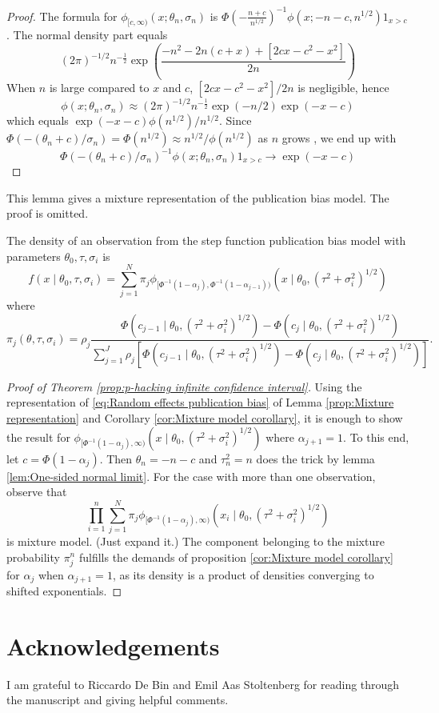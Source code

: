 \documentclass[twoside]{article}
\begin{document}
\begin{proof}
The formula for $\phi_{[c,\infty)}(x;\theta_{n},\sigma_{n})$
is $\Phi(-\frac{n+c}{n^{1/2}})^{-1}\phi(x;-n-c,n^{1/2})1_{x>c}$.
The normal density part equals 
\[
(2\pi)^{-1/2}n^{-\frac{1}{2}}\exp\left(\frac{-n^{2}-2n(c+x)+[2cx-c^{2}-x^{2}]}{2n}\right)
\]
When $n$ is large compared to $x$ and $c$, $[2cx-c^{2}-x^{2}]/2n$
is negligible, hence 
\[
\phi(x;\theta_{n},\sigma_{n})\approx(2\pi)^{-1/2}n^{-\frac{1}{2}}\exp(-n/2)\exp(-x-c)
\]
which equals $\exp(-x-c)\phi(n^{1/2})/n^{1/2}$.
Since $\Phi(-(\theta_{n}+c)/\sigma_{n})=\Phi(n^{1/2})\approx n^{1/2}/\phi(n^{1/2})$
as $n$ grows \citep[equation 5]{borjesson1979simple},
we end up with $$\Phi(-(\theta_{n}+c)/\sigma_{n})^{-1}\phi(x;\theta_{n},\sigma_{n})1_{x>c}\to\exp(-x-c)$$
\end{proof}
%
This lemma gives a mixture representation of the publication bias
model. The proof is omitted.
\begin{lem}
\label{prop:Mixture representation} The density of an observation
from the step function publication bias model with parameters $\theta_{0},\tau,\sigma_{i}$
is
\begin{equation}
f(x\mid\theta_{0},\tau,\sigma_{i})=\sum_{j=1}^{N}\pi_{j}\phi_{[\Phi^{-1}(1-\alpha_{j}),\Phi^{-1}(1-\alpha_{j-1}))}(x\mid\theta_{0},(\tau^{2}+\sigma_{i}^{2})^{1/2})\label{eq:Random effects publication bias}
\end{equation}
where 
\[
\pi_{j}(\theta,\tau,\sigma_{i})=\rho_{j}\frac{\Phi(c_{j-1}\mid\theta_{0},(\tau^{2}+\sigma_{i}^{2})^{1/2})-\Phi(c_{j}\mid\theta_{0},(\tau^{2}+\sigma_{i}^{2})^{1/2})}{\sum_{j=1}^{J}\rho_{j}[\Phi(c_{j-1}\mid\theta_{0},(\tau^{2}+\sigma_{i}^{2})^{1/2})-\Phi(c_{j}\mid\theta_{0},(\tau^{2}+\sigma_{i}^{2})^{1/2})]}.
\]
\end{lem}

\begin{proof}[Proof of Theorem \ref{prop:p-hacking infinite confidence interval}]
Using the representation of \cref{eq:Random effects publication bias}
of Lemma \ref{prop:Mixture representation} and Corollary \ref{cor:Mixture model corollary}, 
it is enough to show the result for $\phi_{[\Phi^{-1}(1-\alpha_{j}),\infty)}(x\mid\theta_{0},(\tau^{2}+\sigma_{i}^{2})^{1/2})$
where $\alpha_{j+1}=1$. To this end, let $c=\Phi(1-\alpha_{j})$.
Then $\theta_{n}=-n-c$ and $\tau_{n}^{2}=n$ does the trick by lemma
\ref{lem:One-sided normal limit}. For the case with more than one
observation, observe that 
\[
\prod_{i=1}^{n}\sum_{j=1}^{N}\pi_{j}\phi_{[\Phi^{-1}(1-\alpha_{j}),\infty)}(x_{i}\mid\theta_{0},(\tau^{2}+\sigma_{i}^{2})^{1/2})
\]
is mixture model. (Just expand it.) The component belonging to the
mixture probability $\pi_{j}^{n}$ fulfills the demands of proposition
\ref{cor:Mixture model corollary} for $\alpha_{j}$ when $\alpha_{j+1}=1$,
as its density is a product of densities converging to shifted exponentials.
\end{proof}


\section*{Acknowledgements}
I am grateful to Riccardo De Bin and Emil Aas Stoltenberg for reading through the manuscript and giving helpful comments.



\end{document}
